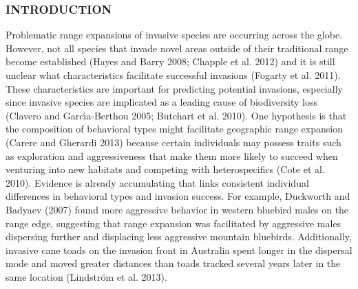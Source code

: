 \documentclass[
]{article}
\begin{document}
\hypertarget{introduction}{%
\subsubsection{INTRODUCTION}\label{introduction}}

Problematic range expansions of invasive species are occurring across
the globe. However, not all species that invade novel areas outside of
their traditional range become established (Hayes and Barry 2008;
Chapple et al. 2012) and it is still unclear what characteristics
facilitate successful invasions (Fogarty et al. 2011). These
characteristics are important for predicting potential invasions,
especially since invasive species are implicated as a leading cause of
biodiversity loss (Clavero and Garcı́a-Berthou 2005; Butchart et al.
2010). One hypothesis is that the composition of behavioral types might
facilitate geographic range expansion (Carere and Gherardi 2013) because
certain individuals may possess traits such as exploration and
aggressiveness that make them more likely to succeed when venturing into
new habitats and competing with heterospecifics (Cote et al. 2010).
Evidence is already accumulating that links consistent individual
differences in behavioral types and invasion success. For example,
Duckworth and Badyaev (2007) found more aggressive behavior in western
bluebird males on the range edge, suggesting that range expansion was
facilitated by aggressive males dispersing further and displacing less
aggressive mountain bluebirds. Additionally, invasive cane toads on the
invasion front in Australia spent longer in the dispersal mode and moved
greater distances than toads tracked several years later in the same
location (Lindström et al. 2013).
\end{document}
